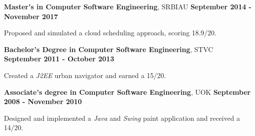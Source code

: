 \vspace*{-1pt}

\begin{scholarship}
\scholarshipentry{}
{\textbf{Master's in Computer Software Engineering}, SRBIAU \hspace{120 pt } \textbf{September 2014 - November 2017}

Proposed and simulated a cloud scheduling approach, scoring 18.9/20. \vspace{5 pt}
}
\scholarshipentry{}
				{\textbf{Bachelor's Degree in Computer Software Engineering}, STVC \hspace{100 pt } \textbf{September 2011 - October 2013}
 
				Created a \emph{J2EE} urban navigator and earned a 15/20. \vspace{5 pt}	
}		
\scholarshipentry{}
				{\textbf{Associate's degree in Computer Software Engineering}, UOK \hspace{90 pt} \textbf{September 2008 - November 2010}
 
				Designed and implemented a \emph{Java} and \emph{Swing} paint application and received a 14/20.
}
\end{scholarship}
